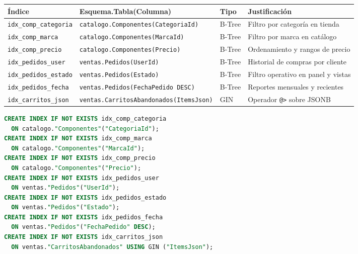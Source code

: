 \begin{center}
\label{tab:indices}
\begin{tablaAPA}
\begin{tabular}{L{3.5cm} L{4.2cm} C{1.5cm} L{5.2cm}}
\toprule
\textbf{\'Indice} & \textbf{Esquema.Tabla(Columna)} & \textbf{Tipo} & \textbf{Justificaci\'on} \\
\midrule
\texttt{idx\_comp\_categoria} & \texttt{catalogo.Componentes(CategoriaId)} & B-Tree & Filtro por categor\'ia en tienda \\
\texttt{idx\_comp\_marca}     & \texttt{catalogo.Componentes(MarcaId)}     & B-Tree & Filtro por marca en cat\'alogo \\
\texttt{idx\_comp\_precio}    & \texttt{catalogo.Componentes(Precio)}      & B-Tree & Ordenamiento y rangos de precio \\
\texttt{idx\_pedidos\_user}   & \texttt{ventas.Pedidos(UserId)}            & B-Tree & Historial de compras por cliente \\
\texttt{idx\_pedidos\_estado} & \texttt{ventas.Pedidos(Estado)}            & B-Tree & Filtro operativo en panel y vistas \\
\texttt{idx\_pedidos\_fecha}  & \texttt{ventas.Pedidos(FechaPedido DESC)}  & B-Tree & Reportes mensuales y recientes \\
\texttt{idx\_carritos\_json}  & \texttt{ventas.CarritosAbandonados(ItemsJson)} & GIN & Operador \texttt{@>} sobre JSONB \\
\bottomrule
\end{tabular}
\end{tablaAPA}
\end{center}

\begin{lstlisting}[language=SQL, caption={Creacion de los 6 indices B-Tree y 1 indice GIN}, label=lst:indices]
CREATE INDEX IF NOT EXISTS idx_comp_categoria
  ON catalogo."Componentes"("CategoriaId");
CREATE INDEX IF NOT EXISTS idx_comp_marca
  ON catalogo."Componentes"("MarcaId");
CREATE INDEX IF NOT EXISTS idx_comp_precio
  ON catalogo."Componentes"("Precio");
CREATE INDEX IF NOT EXISTS idx_pedidos_user
  ON ventas."Pedidos"("UserId");
CREATE INDEX IF NOT EXISTS idx_pedidos_estado
  ON ventas."Pedidos"("Estado");
CREATE INDEX IF NOT EXISTS idx_pedidos_fecha
  ON ventas."Pedidos"("FechaPedido" DESC);
CREATE INDEX IF NOT EXISTS idx_carritos_json
  ON ventas."CarritosAbandonados" USING GIN ("ItemsJson");
\end{lstlisting}

